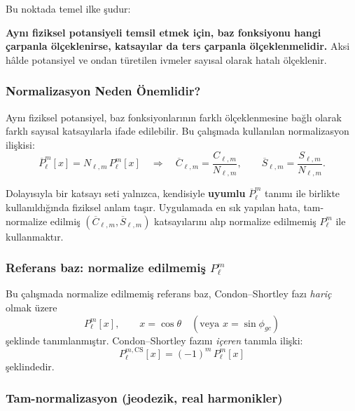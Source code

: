 Bu noktada temel ilke şudur:

\medskip
\noindent
\textbf{Aynı fiziksel potansiyeli temsil etmek için,
baz fonksiyonu hangi çarpanla ölçeklenirse,
katsayılar da ters çarpanla ölçeklenmelidir.}
Aksi hâlde potansiyel ve ondan türetilen ivmeler
sayısal olarak hatalı ölçeklenir.

\subsubsection{Normalizasyon Neden Önemlidir?}
\label{subsec:why_norm}

Aynı fiziksel potansiyel,
baz fonksiyonlarının farklı ölçeklenmesine bağlı olarak
farklı sayısal katsayılarla ifade edilebilir.
Bu çalışmada kullanılan normalizasyon ilişkisi:
\begin{equation}
\overline{P}_{\ell}^{m}[x] = N_{\ell,m}\,P_{\ell}^{m}[x]
\quad\Longrightarrow\quad
\overline{C}_{\ell,m} = \frac{C_{\ell,m}}{N_{\ell,m}},
\qquad
\overline{S}_{\ell,m} = \frac{S_{\ell,m}}{N_{\ell,m}}.
\end{equation}

Dolayısıyla bir katsayı seti yalnızca,
kendisiyle \textbf{uyumlu} $\overline{P}_{\ell}^{m}$ tanımı ile
birlikte kullanıldığında fiziksel anlam taşır.
Uygulamada en sık yapılan hata,
tam-normalize edilmiş $(\overline{C}_{\ell,m},\overline{S}_{\ell,m})$
katsayılarını alıp normalize edilmemiş $P_{\ell}^{m}$ ile kullanmaktır.

\subsubsection{Referans baz: normalize edilmemiş $P_{\ell}^{m}$}
\label{subsubsec:unnorm_plm}

Bu çalışmada normalize edilmemiş referans baz,
Condon--Shortley fazı \emph{hariç} olmak üzere
\[
P_{\ell}^{m}[x],
\qquad x = \cos\theta
\quad (\text{veya } x = \sin\phi_{gc})
\]
şeklinde tanımlanmıştır.
Condon--Shortley fazını \emph{içeren} tanımla ilişki:
\[
P_{\ell}^{m,\mathrm{CS}}[x] = (-1)^m\,P_{\ell}^{m}[x]
\]
şeklindedir.

\subsubsection{Tam-normalizasyon (jeodezik, real harmonikler)}
\label{subsubsec:types_norm}

